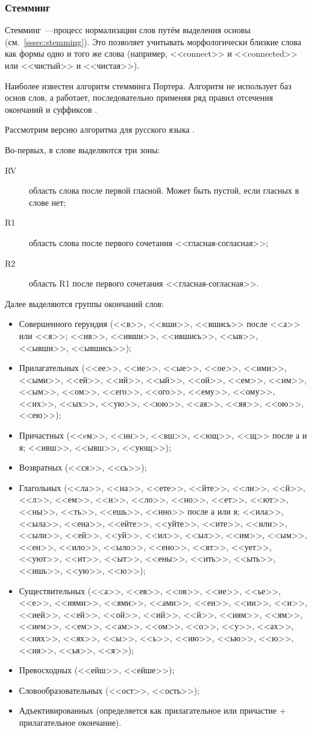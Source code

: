 \subsubsection{Стемминг}
Стемминг~---процесс нормализации слов путём выделения основы (см.~\ref{sssec:stemming}). Это позволяет учитывать морфологически близкие слова как формы одно и того же слова (например, <<connect>> и <<connected>> или <<чистый>> и <<чистая>>).

Наиболее известен алгоритм стемминга Портера. Алгоритм не использует баз основ слов, а работает, последовательно применяя ряд правил отсечения окончаний и суффиксов \cite{porter97}.

Рассмотрим версию алгоритма для русского языка \cite{porter06}.

Во-первых, в слове выделяются три зоны:
\begin{description}
    \item[RV] область слова после первой гласной. Может быть пустой, если гласных в слове нет;
    \item[R1] область слова после первого сочетания <<гласная-согласная>>;
    \item[R2] область R1 после первого сочетания <<гласная-согласная>>.
\end{description}

Далее выделяются группы окончаний слов:
\begin{itemize}
    \item Совершенного герундия (<<в>>, <<вши>>, <<вшись>> после <<а>> или <<я>>; <<ив>>, <<ивши>>, <<ившись>>, <<ыв>>, <<ывши>>, <<ывшись>>);
    \item Прилагательных (<<ее>>, <<ие>>, <<ые>>, <<ое>>, <<ими>>, <<ыми>>, <<ей>>, <<ий>>, <<ый>>, <<ой>>, <<ем>>, <<им>>, <<ым>>, <<ом>>, <<его>>, <<ого>>, <<ему>>, <<ому>>, <<их>>, <<ых>>, <<ую>>, <<юю>>, <<ая>>, <<яя>>, <<ою>>, <<ею>>);
    \item Причастных (<<eм>>, <<нн>>, <<вш>>, <<ющ>>, <<щ>> после а и я; <<ивш>>, <<ывш>>, <<ующ>>);
    \item Возвратных (<<ся>>, <<сь>>);
    \item Глагольных (<<ла>>, <<на>>, <<ете>>, <<йте>>, <<ли>>, <<й>>, <<л>>, <<ем>>, <<н>>, <<ло>>, <<но>>, <<ет>>, <<ют>>, <<ны>>, <<ть>>, <<ешь>>, <<нно>> после а или я; <<ила>>, <<ыла>>, <<ена>>, <<ейте>>, <<уйте>>, <<ите>>, <<или>>, <<ыли>>, <<ей>>, <<уй>>, <<ил>>, <<ыл>>, <<им>>, <<ым>>, <<ен>>, <<ило>>, <<ыло>>, <<ено>>, <<ят>>, <<ует>>, <<уют>>, <<ит>>, <<ыт>>, <<ены>>, <<ить>>, <<ыть>>, <<ишь>>, <<ую>>, <<ю>>);
    \item Существительных (<<а>>, <<ев>>, <<ов>>, <<ие>>, <<ье>>, <<е>>, <<иями>>, <<ями>>, <<ами>>, <<еи>>, <<ии>>, <<и>>, <<ией>>, <<ей>>, <<ой>>, <<ий>>, <<й>>, <<иям>>, <<ям>>, <<ием>>, <<ем>>, <<ам>>, <<ом>>, <<о>>, <<у>>, <<ах>>, <<иях>>, <<ях>>, <<ы>>, <<ь>>, <<ию>>, <<ью>>, <<ю>>, <<ия>>, <<ья>>, <<я>>);
    \item Превосходных (<<ейш>>, <<ейше>>);
    \item Словообразовательных (<<ост>>, <<ость>>);
    \item Адъективированных (определяется как прилагательное или причастие + прилагательное окончание).
\end{itemize}

